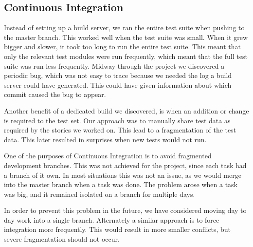 \subsection{Continuous Integration}
Instead of setting up a build server, we ran the entire test suite when pushing to the master branch. This worked well when the test suite was small. When it grew bigger and slower, it took too long to run the entire test suite. This meant that only the relevant test modules were run frequently, which meant that the full test suite was run less frequently.
Midway through the project we discovered a periodic bug, which was not easy to trace because we needed the log a build server could have generated. This could have given information about which commit caused the bug to appear.

Another benefit of a dedicated build we discovered, is when an addition or change is required to the test set. Our approach was to manually share test data as required by the stories we worked on. This lead to a fragmentation of the test data. This later resulted in surprises when new tests would not run.

One of the purposes of Continuous Integration is to avoid fragmented development branches. This was not achieved for the project, since each task had a branch of it own. In most situations this was not an issue, as we would merge into the master branch when a task was done. The problem arose when a task was big, and it remained isolated on a branch for multiple days.

In order to prevent this problem in the future, we have considered moving day to day work into a single branch. Alternately a similar approach is to force integration more frequently. This would result in more smaller conflicts, but severe fragmentation should not occur.